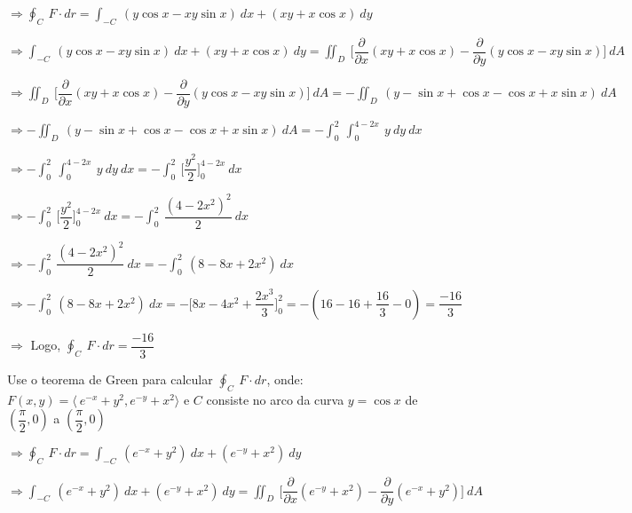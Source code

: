 \documentclass[11pt,a4paper]{article}
\begin{document}
\begin{enumerate}
{		$\Rightarrow \displaystyle\oint_C\ F \cdot dr = \displaystyle\int_{-C}\ (y \cos x - xy\sin x)\ dx + (xy + x \cos x)\ dy$
		
		$\Rightarrow \displaystyle\int_{-C}\ (y \cos x - xy\sin x)\ dx + (xy + x \cos x)\ dy = \displaystyle\iint_D\ \Bigg[\dfrac{\partial}{\partial x}(xy + x\cos x) - \dfrac{\partial}{\partial y}(y \cos x - xy\sin x)\Bigg]\ dA$
		
		$\Rightarrow \displaystyle\iint_D\ \Bigg[\dfrac{\partial}{\partial x}(xy + x\cos x) - \dfrac{\partial}{\partial y}(y \cos x - xy\sin x)\Bigg]\ dA = -\displaystyle\iint_D\ (y - \sin x + \cos x - \cos x + x\sin x)\ dA$
		
		$\Rightarrow -\displaystyle\iint_D\ (y - \sin x + \cos x - \cos x + x\sin x)\ dA = -\displaystyle\int_{0}^{2}\ \displaystyle\int_{0}^{4 - 2x}\ y\ dy\ dx$
		
		$\Rightarrow -\displaystyle\int_{0}^{2}\ \displaystyle\int_{0}^{4 - 2x}\ y\ dy\ dx = -\displaystyle\int_{0}^{2}\ \Bigg[\dfrac{y^2}{2}\Bigg]_0^{4 - 2x}\ dx$
		
		$\Rightarrow  -\displaystyle\int_{0}^{2}\ \Bigg[\dfrac{y^2}{2}\Bigg]_0^{4 - 2x}\ dx = -\displaystyle\int_{0}^{2}\ \dfrac{(4 - 2x^2)^2}{2}\ dx$
		
		$\Rightarrow -\displaystyle\int_{0}^{2}\ \dfrac{(4 - 2x^2)^2}{2}\ dx = -\displaystyle\int_{0}^{2}\ (8 - 8x + 2x^2)\ dx$
		
		$\Rightarrow -\displaystyle\int_{0}^{2}\ (8 - 8x + 2x^2)\ dx = - \Bigg[8x - 4x^2 + \dfrac{2x^3}{3}\Bigg]_0^2 = - (16 - 16 + \dfrac{16}{3} - 0) = \dfrac{-16}{3}$
		
		$\Rightarrow$ Logo, $\displaystyle\oint_C\ F \cdot dr = \dfrac{-16}{3}$
		
		\item Use o teorema de Green para calcular $\displaystyle\oint_C\ F \cdot dr$, onde: $F(x,y) = \langle\ e^{-x} + y^2, e^{-y} + x^2\rangle$ e $C$ consiste no arco da curva $y = \cos x$ de $(\dfrac{\pi}{2},0)$ a $(\dfrac{\pi}{2},0)$
		
		$\Rightarrow \displaystyle\oint_C\ F \cdot dr = \displaystyle\int_{-C}\ (e^{-x} + y^2)\ dx + (e^{-y} + x^2)\ dy$
		
		$\Rightarrow \displaystyle\int_{-C}\ (e^{-x} + y^2)\ dx + (e^{-y} + x^2)\ dy = \displaystyle\iint_D\ \Bigg[\dfrac{\partial}{\partial x}(e^{-y} + x^2) - \dfrac{\partial}{\partial y}(e^{-x} + y^2)\Bigg]\ dA$
		
}
\end{enumerate}
\end{document}

